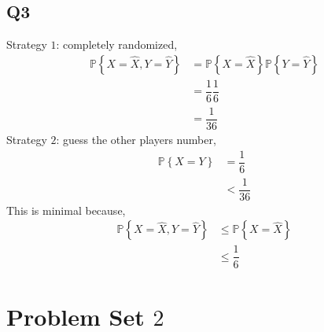 \documentclass{article}
\begin{document}
\subsection{Q3}
Strategy $1$: completely randomized,
\begin{align*}
\mathbb{P}\left\{X = \hat{X}, Y = \hat{Y}\right\} &= \mathbb{P}\left\{X = \hat{X}\right\} \mathbb{P}\left\{Y = \hat{Y}\right\}
\\ &= \dfrac{1}{6} \dfrac{1}{6}
\\ &= \dfrac{1}{36}
\end{align*}
Strategy $2$: guess the other players number,
\begin{align*}
\mathbb{P}\left\{X = Y\right\} &= \dfrac{1}{6}
\\ &< \dfrac{1}{36}
\end{align*}
This is minimal because,
\begin{align*}
\mathbb{P}\left\{X = \hat{X}, Y = \hat{Y}\right\} &\leq  \mathbb{P}\left\{X = \hat{X}\right\}
\\ &\leq  \dfrac{1}{6}
\end{align*}





\section{Problem Set $2$} 
\end{document}
